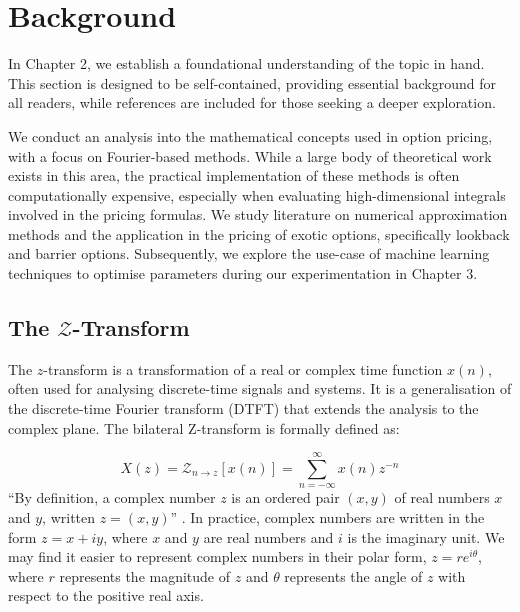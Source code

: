 \documentclass[a4paper]{report}
\begin{document}
\chapter{Background}

In Chapter 2, we establish a foundational understanding of the topic in hand. This section is designed to be self-contained, providing essential background for all readers, while references are included for those seeking a deeper exploration.

We conduct an analysis into the mathematical concepts used in option pricing, with a focus on Fourier-based methods. While a large body of theoretical work exists in this area, the practical implementation of these methods is often computationally expensive, especially when evaluating high-dimensional integrals involved in the pricing formulas. We study literature on numerical approximation methods and the application in the pricing of exotic options, specifically lookback and barrier options. Subsequently, we explore the use-case of machine learning techniques to optimise parameters during our experimentation in Chapter 3.

\section{The \texorpdfstring{$\mathcal{Z}$}{Lg}-Transform}\label{z_transform}

The $z$-transform is a transformation of a real or complex time function $x(n)$, often used for analysing discrete-time signals and systems. It is a generalisation of the discrete-time Fourier transform (DTFT) that extends the analysis to the complex plane. The bilateral Z-transform is formally defined as:

\begin{equation}\label{bilateral_z-transform}
X(z) = \mathcal{Z}_{n \rightarrow z}[x(n)] = \sum^{\infty}_{n = -\infty} x(n)z^{-n}
\end{equation}
``By definition, a complex number $z$ is an ordered pair $(x, y)$ of real numbers $x$ and $y$, written $z = (x, y)$'' \citep{kreyszig2010advanced}. In practice, complex numbers are written in the form $z = x + iy$, where $x$ and $y$ are real numbers and $i$ is the imaginary unit. We may find it easier to represent complex numbers in their polar form, $z = re^{i\theta}$, where $r$ represents the magnitude of $z$ and $\theta$ represents the angle of $z$ with respect to the positive real axis.
\end{document}
